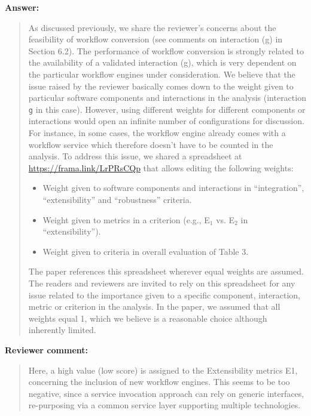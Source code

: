 \documentclass[a4]{article}
\newenvironment{review}%
{\textbf{Reviewer comment:}\begin{quote}}%
{\end{quote}}%
\newenvironment{answer}%
{\textbf{Answer:}\begin{small}\begin{quote}}%
{\end{quote}\end{small}}%
\begin{document}
\begin{answer}

  As discussed previously, we share the reviewer's concerns about the
  feasibility of workflow conversion (see comments on interaction (g)
  in Section 6.2). The performance of workflow conversion is strongly
  related to the availability of a validated interaction (g), which is
  very dependent on the particular workflow engines under
  consideration. We believe that the issue raised by the reviewer
  basically comes down to the weight given to particular software
  components and interactions in the analysis (interaction \texttt{g}
  in this case). However, using different weights for different
  components or interactions would open an infinite number of
  configurations for discussion. For instance, in some cases, the
  workflow engine already comes with a workflow service which
  therefore doesn't have to be counted in the analysis. To address this issue, we
  shared a spreadsheet at \url{https://frama.link/LrPRsCQp} that
  allows editing the following weights:
  \begin{itemize}
  \item Weight given to software components and interactions in
  ``integration'', ``extensibility'' and ``robustness'' criteria.
  \item Weight given to metrics in a criterion (e.g., E$_1$ vs. E$_2$ in
  ``extensibility'').
  \item Weight given to criteria in overall evaluation of Table 3.
\end{itemize}
The paper references this spreadsheet wherever equal weights are
assumed. The readers and reviewers are invited to rely on this
spreadsheet for any issue related to the importance given to a
specific component, interaction, metric or criterion in the
analysis. In the paper, we assumed that all weights equal 1, which we
believe is a reasonable choice although inherently limited.

\end{answer}

\begin{review}
  Here, a high value (low score) is assigned to the Extensibility
  metrics E1, concerning the inclusion of new workflow engines. This
  seems to be too negative, since a service invocation approach can
  rely on generic interfaces, re-purposing via a common service layer
  supporting multiple technologies.
\end{review}
\end{document}
